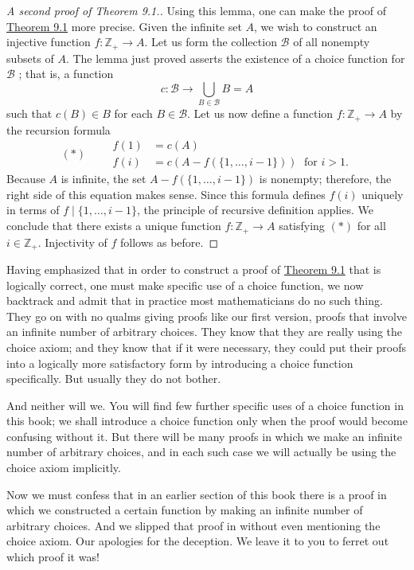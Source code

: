\begin{proof}[A second proof of Theorem 9.1.]
 Using this lemma, one can make the proof of \hyperref[thm:9.1]{Theorem 9.1} more precise. Given the infinite set \(A\), we wish to construct an injective function \(f : \mathbb{Z}_{+} \rightarrow A\). Let us form the collection \(\mathcal{B}\) of all nonempty subsets of \(A\). The lemma just proved asserts the existence of a choice function for \(\mathcal{B}\) ; that is, a function
 \[
 c : \mathcal{B} \rightarrow \mathop{\bigcup }\limits_{{B \in \mathcal{B}}}B = A
 \]
 such that \(c(B) \in B\) for each \(B \in \mathcal{B}\). Let us now define a function \(f : \mathbb{Z}_{+} \rightarrow A\) by the recursion formula
 \[
 (*) \qquad
 \begin{aligned}
 f(1) &= c(A) \\
 f(i) &= c({A - f({\{1,\ldots, i - 1\} }) }) \;\text{ for }i > 1.
 \end{aligned}
 \]
 Because \(A\) is infinite, the set \(A - f({\{1,\ldots, i - 1\} })\) is nonempty; therefore, the right side of this equation makes sense. Since this formula defines \(f(i)\) uniquely in terms of \(f \mid \{1,\ldots, i - 1\}\), the principle of recursive definition applies. We conclude that there exists a unique function \(f : \mathbb{Z}_{+} \rightarrow A\) satisfying \((*)\) for all \(i \in {\mathbb{Z}}_{+}\). Injectivity of \(f\) follows as before.
\end{proof}

Having emphasized that in order to construct a proof of \hyperref[thm:9.1]{Theorem 9.1} that is logically correct, 
one must make specific use of a choice function, we now backtrack and admit that in practice 
most mathematicians do no such thing. They go on with no qualms giving proofs like our first version, 
proofs that involve an infinite number of arbitrary choices. They know that they are really using the 
choice axiom; and they know that if it were necessary, they could put their proofs into a logically 
more satisfactory form by introducing a choice function specifically. But usually they do not bother.

And neither will we. You will find few further specific uses of a choice function in this book; 
we shall introduce a choice function only when the proof would become confusing without it. 
But there will be many proofs in which we make an infinite number of arbitrary choices, 
and in each such case we will actually be using the choice axiom implicitly.

Now we must confess that in an earlier section of this book there is a proof in which we constructed 
a certain function by making an infinite number of arbitrary choices. And we slipped that proof 
in without even mentioning the choice axiom. Our apologies for the deception. We leave it to you 
to ferret out which proof it was!


